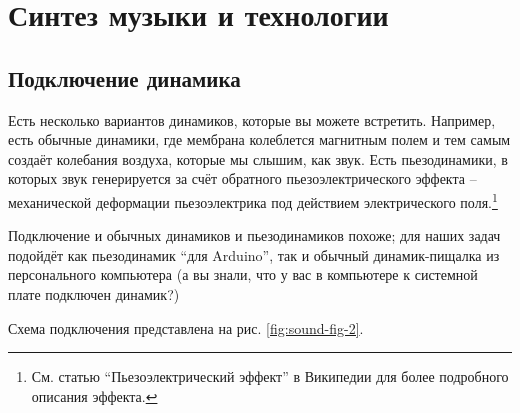 \documentclass[a4paper,twoside]{book}
\begin{document}

\chapter{Синтез музыки и технологии}



\section{Подключение динамика}

Есть несколько вариантов динамиков, которые вы можете встретить. Например, есть
обычные динамики, где мембрана колеблется магнитным полем и тем самым создаёт
колебания воздуха, которые мы слышим, как звук. Есть пьезодинамики, в которых
звук генерируется за счёт обратного пьезоэлектрического эффекта -- механической
деформации пьезоэлектрика под действием электрического поля.\footnote{См. статью
``Пьезоэлектрический эффект'' в Википедии для более подробного описания эффекта.}

Подключение и обычных динамиков и пьезодинамиков похоже; для наших задач
подойдёт как пьезодинамик ``для Arduino'', так и обычный динамик-пищалка из
персонального компьютера (а вы знали, что у вас в компьютере к системной плате
подключен динамик?)

Схема подключения представлена на рис. \ref{fig:sound-fig-2}.
\end{document}
